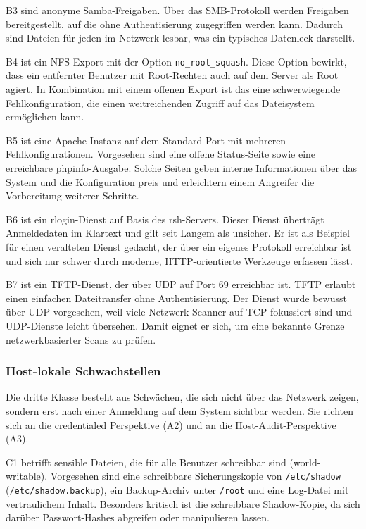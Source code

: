 B3 sind anonyme Samba-Freigaben. Über das SMB-Protokoll werden Freigaben bereitgestellt, auf die ohne
Authentisierung zugegriffen werden kann. Dadurch sind Dateien für jeden im Netzwerk lesbar, was ein
typisches Datenleck darstellt.

B4 ist ein NFS-Export mit der Option \texttt{no\_root\_squash}. Diese Option bewirkt, dass ein
entfernter Benutzer mit Root-Rechten auch auf dem Server als Root agiert. In Kombination mit einem
offenen Export ist das eine schwerwiegende Fehlkonfiguration, die einen weitreichenden Zugriff auf
das Dateisystem ermöglichen kann.

B5 ist eine Apache-Instanz auf dem Standard-Port mit mehreren Fehlkonfigurationen. Vorgesehen sind
eine offene Status-Seite sowie eine erreichbare phpinfo-Ausgabe. Solche Seiten geben interne
Informationen über das System und die Konfiguration preis und erleichtern einem Angreifer die
Vorbereitung weiterer Schritte.

B6 ist ein rlogin-Dienst auf Basis des rsh-Servers. Dieser Dienst überträgt Anmeldedaten im Klartext
und gilt seit Langem als unsicher. Er ist als Beispiel für einen veralteten Dienst gedacht, der über
ein eigenes Protokoll erreichbar ist und sich nur schwer durch moderne, HTTP-orientierte Werkzeuge
erfassen lässt.

B7 ist ein TFTP-Dienst, der über UDP auf Port 69 erreichbar ist. TFTP erlaubt einen einfachen
Dateitransfer ohne Authentisierung. Der Dienst wurde bewusst über UDP vorgesehen, weil viele
Netzwerk-Scanner auf TCP fokussiert sind und UDP-Dienste leicht übersehen. Damit eignet er sich, um
eine bekannte Grenze netzwerkbasierter Scans zu prüfen.

\subsubsection{Host-lokale Schwachstellen}

Die dritte Klasse besteht aus Schwächen, die sich nicht über das Netzwerk zeigen, sondern erst nach
einer Anmeldung auf dem System sichtbar werden. Sie richten sich an die credentialed Perspektive (A2)
und an die Host-Audit-Perspektive (A3).

C1 betrifft sensible Dateien, die für alle Benutzer schreibbar sind (world-writable). Vorgesehen sind
eine schreibbare Sicherungskopie von \texttt{/etc/shadow} (\texttt{/etc/shadow.backup}), ein
Backup-Archiv unter \texttt{/root} und eine Log-Datei mit vertraulichem Inhalt. Besonders kritisch ist
die schreibbare Shadow-Kopie, da sich darüber Passwort-Hashes abgreifen oder manipulieren lassen.

